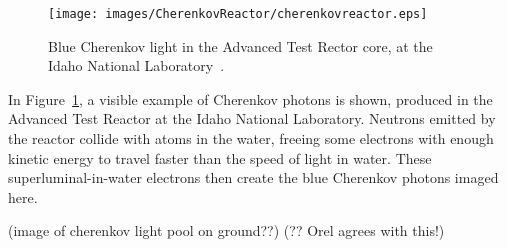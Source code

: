   \begin{figure}[ht]
    \centering
    \texttt{[image: images/CherenkovReactor/cherenkovreactor.eps]}
    \caption[Chernekov Light from a Reactor]{
      Blue Cherenkov light in the Advanced Test Rector core, at the Idaho National Laboratory~\cite{cherenkovreactor,atrlab}.
    }
    \label{fig:cherenkovreactor}
  \end{figure}
  
  In Figure~\ref{fig:cherenkovreactor}, a visible example of Cherenkov photons is shown, produced in the Advanced Test Reactor at the Idaho National Laboratory.
  Neutrons emitted by the reactor collide with atoms in the water, freeing some electrons with enough kinetic energy to travel faster than the speed of light in water.
  These superluminal-in-water electrons then create the blue Cherenkov photons imaged here.
  
  {\color{red}(image of cherenkov light pool on ground??)}
  {\color{red}(?? Orel agrees with this!)}
  
  
